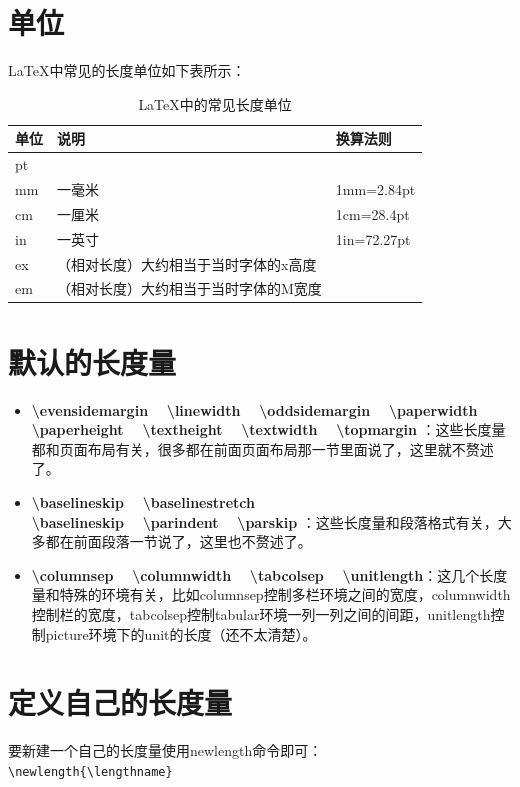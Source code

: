 \documentclass[11pt,oneside]{book}
\begin{document}
\section{单位}
\LaTeX{}中常见的长度单位如下表所示：
\begin{table}[H]
\centering
\label{tab:LaTeX中的常见长度单位}
\caption{\LaTeX{}中的常见长度单位}
\medskip 
\begin{tabular}{@{}lll@{}}
\toprule
单位 & 说明 & 换算法则 \\ \midrule
pt  &   &\\
mm  & 一毫米  & 1mm=2.84pt \\
cm  &  一厘米  &  1cm=28.4pt \\
in  &  一英寸 & 1in=72.27pt \\
ex  &  （相对长度）大约相当于当时字体的x高度 & \\
em  & （相对长度）大约相当于当时字体的M宽度 & \\ \bottomrule
\end{tabular}
\end{table}


\section{默认的长度量}
\begin{itemize}
\item \textbf{\textbackslash evensidemargin ~ \textbackslash linewidth ~ \textbackslash oddsidemargin ~ \textbackslash paperwidth ~  \textbackslash paperheight ~ \textbackslash textheight ~ \textbackslash textwidth ~ \textbackslash topmargin }：这些长度量都和页面布局有关，很多都在前面页面布局那一节里面说了，这里就不赘述了。
\item \textbf{\textbackslash baselineskip ~ \textbackslash baselinestretch ~\\ \textbackslash baselineskip ~  \textbackslash parindent  ~ \textbackslash parskip }：这些长度量和段落格式有关，大多都在前面段落一节说了，这里也不赘述了。
\item \textbf{\textbackslash columnsep ~ \textbackslash columnwidth ~ \textbackslash tabcolsep ~ \textbackslash unitlength}：这几个长度量和特殊的环境有关，比如columnsep控制多栏环境之间的宽度，columnwidth控制栏的宽度，tabcolsep控制tabular环境一列一列之间的间距，unitlength控制picture环境下的unit的长度（还不太清楚）。
\end{itemize}

 
\section{定义自己的长度量}
要新建一个自己的长度量使用newlength命令即可：\\
\verb+\newlength{\lengthname}+
\end{document}
